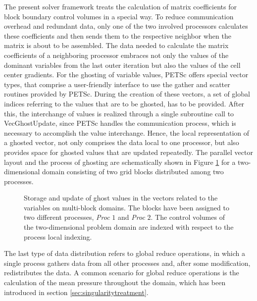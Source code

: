 The present solver framework treats the calculation of matrix coefficients for block boundary control volumes in a special way. To reduce communication overhead and redundant data, only one of the two involved processors calculates these coefficients and then sends them to the respective neighbor when the matrix is about to be assembled. The data needed to calculate the matrix coefficients of a neighboring processor embraces not only the values of the dominant variables from the last outer iteration but also the values of the cell center gradients. For the ghosting of variable values, PETSc offers special vector types, that comprise a user-friendly interface to use the gather and scatter routines provided by PETSc. During the creation of these vectors, a set of global indices referring to the values that are to be ghosted, has to be provided. After this, the interchange of values is realized through a single subroutine call to \textrm{VecGhostUpdate}, since PETSc handles the communication process, which is necessary to accomplish the value interchange. Hence, the local representation of a ghosted vector, not only comprises the data local to one processor, but also provides space for ghosted values that are updated repeatedly. The parallel vector layout and the process of ghosting are schematically shown in Figure \ref{fig:ghosting} for a two-dimensional domain consisting of two grid blocks distributed among two processes.

\begin{figure}[h!]
  \centering
  \label{fig:segassemble}
  
  \caption{Storage and update of ghost values in the vectors related to the variables on multi-block domains. The blocks have been assigned to two different processes, \emph{Proc} $1$ and \emph{Proc} $2$. The control volumes of the two-dimensional problem domain are indexed with respect to the process local indexing.}
  \label{fig:ghosting}
\end{figure}

The last type of data distribution refers to global reduce operations, in which a single process gathers data from all other processes and, after some modification, redistributes the data. A common scenario for global reduce operations is the calculation of the mean pressure throughout the domain, which has been introduced in section \ref{sec:singularitytreatment}.



